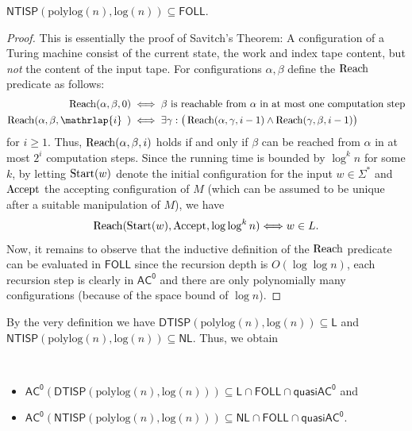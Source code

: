 \documentclass{article}
\newcommand{\Reach}{\mathop{
 			\mbox{{\fontfamily{cmr}\fontseries{m}\fontshape{n}\selectfont
 					Reach}}}\nolimits}
\newcommand{\Accept}{\mathop{
 			\mbox{{\fontfamily{cmr}\fontseries{m}\fontshape{n}\selectfont
 					Accept}}}\nolimits}
\newcommand{\Start}{\mathop{
 			\mbox{{\fontfamily{cmr}\fontseries{m}\fontshape{n}\selectfont
 					Start}}}\nolimits}
\newcommand{\Oh}{O}
\newcommand*{\ComplexityClass}[1]{\ensuremath{\mathsf{#1}}\xspace}
\newcommand*{\NL}{\ComplexityClass{NL}}
\newcommand{\NTISP}{\ComplexityClass{NTISP}}
\newcommand{\DTISP}{\ComplexityClass{DTISP}}
\newcommand{\NTISPpll}{\ensuremath{\NTISP(\mathrm{polylog}(n),\mathrm{log}(n))}\xspace}
\newcommand{\DTISPpll}{\ensuremath{\DTISP(\mathrm{polylog}(n),\mathrm{log}(n))}\xspace}
\newcommand{\ACz}{\ComplexityClass{AC^0}}
\newcommand{\qACz}{\ComplexityClass{quasiAC^0}}
\newcommand{\FOLL}{\ComplexityClass{FOLL}}
\newcommand{\LOGSPACE}{\ComplexityClass{L}} %
\begin{document}
\begin{lemma}\label{lem:DTISPFoll}
   $ \NTISPpll \subseteq \FOLL$.
\end{lemma}
\begin{proof}
    This is essentially the proof of Savitch's Theorem: A configuration of a Turing machine consist of the current state, the work and index tape content, but \emph{not} the content of the input tape. For configurations $\alpha, \beta $ define the $\Reach$ predicate as follows:
 	\begin{align*}
 \Reach(\alpha, \beta, 0)
 		&\iff \beta \text{ is reachable from $\alpha$ in at most one computation step} \\
 \Reach(\alpha, \beta, \mathrlap{i}\phantom{0})
 		&\iff \exists \gamma: \big( \Reach(\alpha, \gamma, i-1) \wedge
 		\Reach(\gamma, \beta, i-1) \big)		
 	\end{align*}
	for $i \geq 1$.
 Thus, $\Reach(\alpha, \beta, i)$ holds if and only if $\beta$ can be reached from $\alpha$ in at most $2^i$ computation steps.
 	Since the running time is bounded by $\log^k n$ for some $k$, by letting $\Start(w)$  denote the initial configuration for the input $w \in \Sigma^*$ and $\Accept$ the accepting configuration of $M$ (which can be assumed to be unique after a suitable manipulation of $M$), we have 
 	\[ \Reach(\Start(w), \Accept, \log \log^k n) \Longleftrightarrow w \in L.\]
  Now, it remains to observe that the inductive definition of the $\Reach$ predicate can be evaluated in \FOLL since the recursion depth is $\Oh(\log\log n)$, each recursion step is clearly in $\ACz$ and there are only polynomially many configurations (because of the space bound of $\log n$).
\end{proof}



\noindent By the very definition we have $\DTISPpll \subseteq \LOGSPACE$ and $\NTISPpll \subseteq \NL$. Thus, we obtain
\begin{fact}\
   \begin{itemize}
    \item $\ACz(\DTISPpll) \subseteq \LOGSPACE \cap \FOLL \cap \qACz$ and
    \item $\ACz(\NTISPpll) \subseteq \NL \cap \FOLL \cap \qACz$.
\end{itemize} 
\end{fact}
\end{document}
